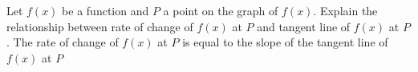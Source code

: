 {Let $f(x)$ be a function and $P$ a point on the graph of $f(x)$.  Explain the relationship between rate of change of $f(x)$ at $P$ and tangent line of $f(x)$ at $P$.}
{The rate of change of $f(x)$ at $P$ is equal to the slope of the tangent line of $f(x)$ at $P$}
